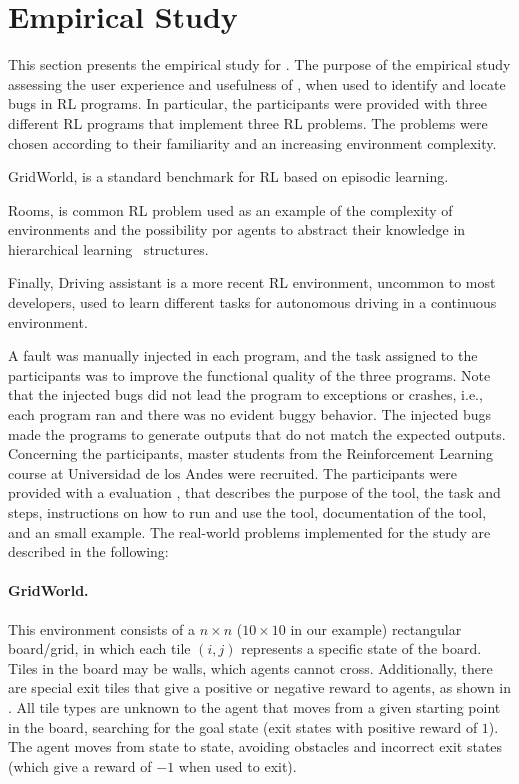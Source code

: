 
\section{Empirical Study}
\label{sec:evaluation}

This section presents the empirical study for \flik. The purpose of the empirical study assessing the 
user experience and usefulness of \flik, when used to identify and locate bugs in  \ac{RL} programs. 
In particular, the participants were provided with three different \ac{RL} programs that implement three 
\ac{RL} problems. The problems were chosen according to their familiarity and an increasing 
environment complexity. 
\begin{enumerate*}[label=(\arabic*)]
\item GridWorld, is a standard benchmark for \ac{RL} based on episodic learning.
\item Rooms, is common \ac{RL} problem used as an example of the complexity of environments and 
the possibility por agents to abstract their knowledge in hierarchical learning~\cite{pateria21} 
structures. \item Finally, Driving assistant is a more recent \ac{RL} environment, uncommon to most 
developers, used to learn different tasks for autonomous driving in a continuous environment. 
\end{enumerate*}

A fault was manually injected in each program, and the task assigned to the participants was to improve the functional quality of the three programs. Note that the injected bugs did not lead the program to exceptions or crashes, i.e., each program ran and there was no evident buggy behavior. The injected bugs made the programs to generate outputs that do not match the expected outputs. Concerning the participants, master students from the Reinforcement Learning course at Universidad de los Andes were recruited.  The participants were provided with a evaluation  , that describes the purpose of the tool, the task and steps, instructions on how to run and 
use the tool, documentation of the tool, and an small example. The real-world problems implemented for the study are described in the following:

\paragraph{\textbf{GridWorld.}}
This environment consists of a $n \times n$ ($10\times 10$ in our example) 
rectangular  board/grid, in which each tile $(i,j)$ represents a specific state of the board. Tiles in the board may be  walls, which agents cannot cross. Additionally, there are special exit  tiles that give a positive or negative reward to agents, as shown in . All tile types are unknown to the agent that moves from a given starting point in the board, searching for the goal state (\ie exit states with positive reward of $1$). The agent moves from state to state, avoiding  obstacles and incorrect exit states (which give a reward of $-1$ when used to exit). 

